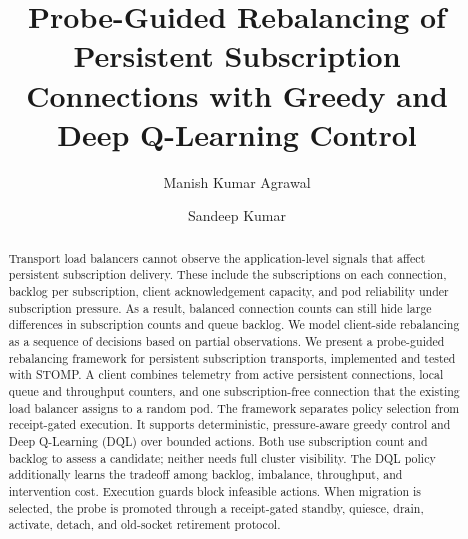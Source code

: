 \documentclass[manuscript,nonacm]{acmart}
\begin{document}
\title[Probe-Guided Rebalancing of Persistent Subscription Connections]{Probe-Guided Rebalancing of Persistent Subscription Connections with Greedy and Deep Q-Learning Control}

\author{Manish Kumar Agrawal}

\author{Sandeep Kumar}

\begin{abstract}
Transport load balancers cannot observe the application-level signals that
affect persistent subscription delivery. These include the subscriptions on
each connection, backlog per subscription, client acknowledgement capacity,
and pod reliability under subscription pressure. As a result, balanced
connection counts can still hide large differences in subscription counts and
queue backlog. We model client-side rebalancing as a sequence of decisions
based on partial observations. We present a probe-guided rebalancing framework
for persistent subscription transports, implemented and tested with STOMP. A
client combines telemetry from active persistent connections, local queue and
throughput counters, and one subscription-free connection that the existing
load balancer assigns to a random pod. The framework separates policy selection
from receipt-gated execution. It supports deterministic, pressure-aware greedy
control and Deep Q-Learning (DQL) over bounded actions. Both use subscription
count and backlog to assess a candidate; neither needs full cluster visibility.
The DQL policy additionally learns the tradeoff among backlog, imbalance,
throughput, and intervention cost. Execution guards block infeasible actions.
When migration is selected, the probe is promoted through a receipt-gated
standby, quiesce, drain, activate, detach, and old-socket retirement protocol.


\end{abstract}
\end{document}
